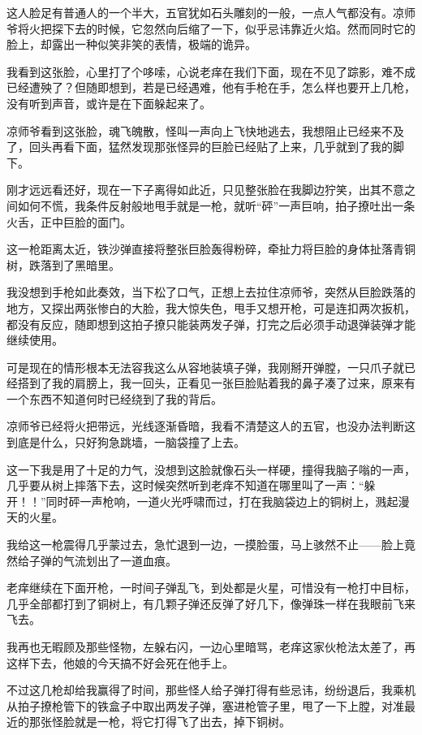 这人脸足有普通人的一个半大，五官犹如石头雕刻的一般，一点人气都没有。凉师爷将火把探下去的时候，它忽然向后缩了一下，似乎忌讳靠近火焰。然而同时它的脸上，却露出一种似笑非笑的表情，极端的诡异。

我看到这张脸，心里打了个哆嗦，心说老痒在我们下面，现在不见了踪影，难不成已经遭殃了？但随即想到，若是已经遇难，他有手枪在手，怎么样也要开上几枪，没有听到声音，或许是在下面躲起来了。

凉师爷看到这张脸，魂飞魄散，怪叫一声向上飞快地逃去，我想阻止已经来不及了，回头再看下面，猛然发现那张怪异的巨脸已经贴了上来，几乎就到了我的脚下。

刚才远远看还好，现在一下子离得如此近，只见整张脸在我脚边狞笑，出其不意之间如何不慌，我条件反射般地甩手就是一枪，就听“砰”一声巨响，拍子撩吐出一条火舌，正中巨脸的面门。

这一枪距离太近，铁沙弹直接将整张巨脸轰得粉碎，牵扯力将巨脸的身体扯落青铜树，跌落到了黑暗里。

我没想到手枪如此奏效，当下松了口气，正想上去拉住凉师爷，突然从巨脸跌落的地方，又探出两张惨白的大脸，我大惊失色，甩手又想开枪，可是连扣两次扳机，都没有反应，随即想到这拍子撩只能装两发子弹，打完之后必须手动退弹装弹才能继续使用。

可是现在的情形根本无法容我这么从容地装填子弹，我刚掰开弹膛，一只爪子就已经搭到了我的肩膀上，我一回头，正看见一张巨脸贴着我的鼻子凑了过来，原来有一个东西不知道何时已经绕到了我的背后。

凉师爷已经将火把带远，光线逐渐昏暗，我看不清楚这人的五官，也没办法判断这到底是什么，只好狗急跳墙，一脑袋撞了上去。

这一下我是用了十足的力气，没想到这脸就像石头一样硬，撞得我脑子嗡的一声，几乎要从树上摔落下去，这时候突然听到老痒不知道在哪里叫了一声：“躲开！！”同时砰一声枪响，一道火光呼啸而过，打在我脑袋边上的铜树上，溅起漫天的火星。

我给这一枪震得几乎蒙过去，急忙退到一边，一摸脸蛋，马上骇然不止——脸上竟然给子弹的气流划出了一道血痕。

老痒继续在下面开枪，一时间子弹乱飞，到处都是火星，可惜没有一枪打中目标，几乎全部都打到了铜树上，有几颗子弹还反弹了好几下，像弹珠一样在我眼前飞来飞去。

我再也无暇顾及那些怪物，左躲右闪，一边心里暗骂，老痒这家伙枪法太差了，再这样下去，他娘的今天搞不好会死在他手上。

不过这几枪却给我赢得了时间，那些怪人给子弹打得有些忌讳，纷纷退后，我乘机从拍子撩枪管下的铁盒子中取出两发子弹，塞进枪管子里，甩了一下上膛，对准最近的那张怪脸就是一枪，将它打得飞了出去，掉下铜树。

